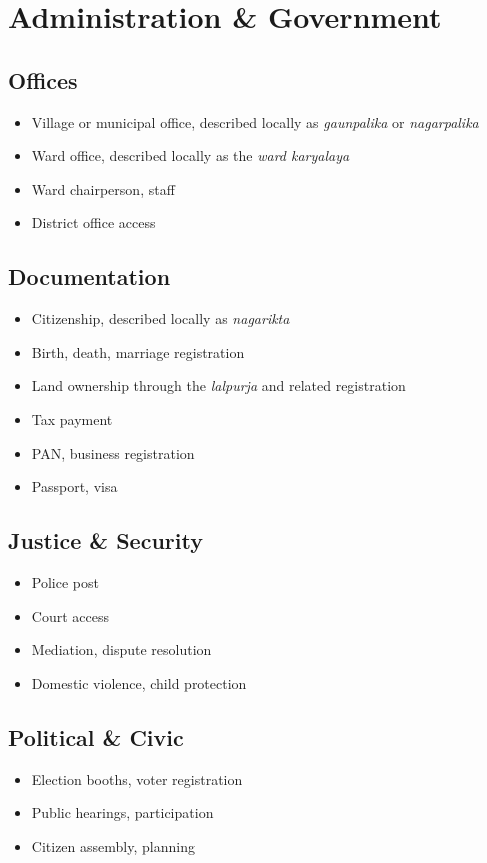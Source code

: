 \documentclass[11pt,a4paper]{article}
\begin{document}
\section{Administration \& Government}

\subsection{Offices}
\begin{itemize}
    \item Village or municipal office, described locally as \textit{gaunpalika} or \textit{nagarpalika}
    \item Ward office, described locally as the \textit{ward karyalaya}
    \item Ward chairperson, staff
    \item District office access
\end{itemize}

\subsection{Documentation}
\begin{itemize}
    \item Citizenship, described locally as \textit{nagarikta}
    \item Birth, death, marriage registration
    \item Land ownership through the \textit{lalpurja} and related registration
    \item Tax payment
    \item PAN, business registration
    \item Passport, visa
\end{itemize}

\subsection{Justice \& Security}
\begin{itemize}
    \item Police post
    \item Court access
    \item Mediation, dispute resolution
    \item Domestic violence, child protection
\end{itemize}

\subsection{Political \& Civic}
\begin{itemize}
    \item Election booths, voter registration
    \item Public hearings, participation
    \item Citizen assembly, planning
\end{itemize}
\end{document}
